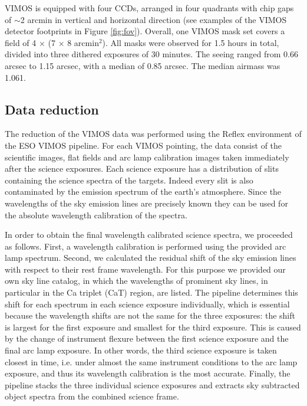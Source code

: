 \documentclass[usenatbib]{mnras}
\begin{document}
VIMOS is equipped with four CCDs, arranged in four quadrants with chip gaps of
$\sim$2 arcmin in vertical and horizontal direction (see examples of the VIMOS
detector footprints in Figure \ref{fig:fov}). Overall, one VIMOS mask set
covers a field of 4 $\times$ (7 $\times$ 8 arcmin$^2$). All masks were observed
for 1.5 hours in total, divided into three dithered exposures of 30 minutes.
The seeing ranged from 0.66 arcsec to 1.15 arcsec, with a median of 0.85 arcsec.
The median airmass was 1.061.

\subsection{Data reduction}

The reduction of the VIMOS data was performed using the Reflex
environment \citep{Freudling13} of the ESO VIMOS pipeline.
For each VIMOS pointing, the data consist of the scientific images, flat fields and
arc lamp calibration images taken immediately after the science
exposures. Each science exposure has a distribution of slits containing the
science spectra of the targets. Indeed every slit is also contaminated by the
emission spectrum of the earth's atmosphere. Since the wavelengths of the
sky emission lines are precisely known they can be used for the absolute
wavelength calibration of the spectra.

In order to obtain the final wavelength calibrated science spectra, we
proceeded as follows. First, a wavelength calibration
is performed using the provided arc lamp spectrum. Second, we calculated the residual
shift of the sky emission lines with respect to their rest frame wavelength.
For this purpose we provided our own sky line catalog, in which
the wavelengths of prominent sky lines, in particular in the Ca triplet (CaT)
region, are listed. The pipeline determines this shift for each spectrum in
each science exposure individually, which is essential because the wavelength
shifts are not the same for the three exposures: the shift is largest for the
first exposure and smallest for the third exposure. This
is caused by the
change of instrument flexure between the first science exposure and the final
arc lamp exposure. In other words, the third science exposure is taken
closest in time, i.e. under almost the same instrument conditions to the arc
lamp exposure, and thus its wavelength calibration is the most accurate.
Finally, the pipeline stacks the three individual science exposures and
extracts sky subtracted object spectra from the combined science frame.
\end{document}
